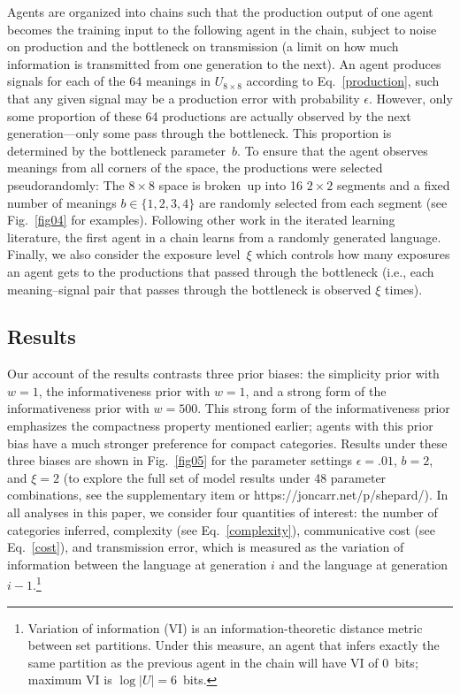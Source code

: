 \documentclass[doc,biblatex]{apa7}
\begin{document}
Agents are organized into chains such that the production output of one agent becomes the training input to the following agent in the chain, subject to noise on production and the bottleneck on transmission (a limit on how much information is transmitted from one generation to the next). An agent produces signals for each of the 64 meanings in $U_{8 \times 8}$ according to Eq.~\ref{production}, such that any given signal may be a production error with probability $\epsilon$. However, only some proportion of these 64 productions are actually observed by the next generation---only some pass through the bottleneck. This proportion is determined by the bottleneck parameter~$b$. To ensure that the agent observes meanings from all corners of the space, the productions were selected pseudorandomly: The $8 \times 8$ space is broken~up into 16 $2 \times 2$ segments and a fixed number of meanings $b \in \{1,2,3,4\}$ are randomly selected from each segment (see Fig.~\ref{fig04} for examples). Following other work in the iterated learning literature, the first agent in a chain learns from a randomly generated language. Finally, we also consider the exposure level~$\xi$ which controls how many exposures an agent gets to the productions that passed through the bottleneck (i.e., each meaning--signal pair that passes through the bottleneck is observed $\xi$ times).

\subsection{Results}

Our account of the results contrasts three prior biases: the simplicity prior with $w=1$, the informativeness prior with $w=1$, and a strong form of the informativeness prior with $w=500$. This strong form of the informativeness prior emphasizes the compactness property mentioned earlier; agents with this prior bias have a much stronger preference for compact categories. Results under these three biases are shown in Fig.~\ref{fig05} for the parameter settings $\epsilon=.01$, $b=2$, and $\xi=2$ (to explore the full set of model results under 48 parameter combinations, see the supplementary item or https://joncarr.net/p/shepard/). In all analyses in this paper, we consider four quantities of interest: the number of categories inferred, complexity (see Eq.~\ref{complexity}), communicative cost (see Eq.~\ref{cost}), and transmission error, which is measured as the variation of information \parencite{Meila:2007} between the language at generation $i$ and the language at generation $i-1$.\footnote{Variation of information (VI) is an information-theoretic distance metric between set partitions. Under this measure, an agent that infers exactly the same partition as the previous agent in the chain will have VI of 0~bits; maximum VI is $\log |U| = 6$~bits.}
\end{document}
